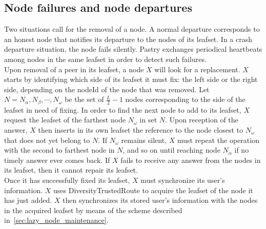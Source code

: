 \subsection{Node failures and node departures}
\label{sec:node_failures_and_departures}
Two situations call for the removal of a node. A normal departure corresponds
to an honest node that notifies its departure to the nodes of its leafset. In a
crash departure situation, the node fails silently. Pastry exchanges
periodical heartbeats among nodes in the same leafset in order to detect such
failures.\\

Upon removal of a peer in its leafset, a node $X$ will look for a replacement.
$X$ starts by identifying which side of its leafset it must fix: the left side
or the right side, depending on the nodeId of the node that was removed. Let $N
= {N_{\alpha}, N_{\beta}, \cdots, N_{\omega}}$ be the set of $\frac{L}{2} - 1$
nodes corresponding to the side of the leafset in need of fixing. In order to
find the next node to add to its leafset, $X$ request the leafset of the
farthest node $N_{\omega}$ in set $N$. Upon reception of the answer, $X$ then
inserts in its own leafset the reference to the node closest to $N_{\omega}$
that does not yet belong to $N$. If $N_{\omega}$ remains silent, $X$ must
repeat the operation with the second to farthest node in $N$, and so on until
reaching node $N_{\alpha}$ if no timely answer ever comes back. If $X$ fails to
receive any answer from the nodes in its leafset, then it cannot repair its
leafset.\\

Once it has successfully fixed its leafset, $X$ must synchronize its user's
information. $X$
uses DiversityTrustedRoute to acquire the leafset of the node it has just
added. $X$ then synchronizes its stored user's information with the nodes in
the acquired leafset by means of the scheme described in~\ref{sec:lazy_node_maintenance}.

